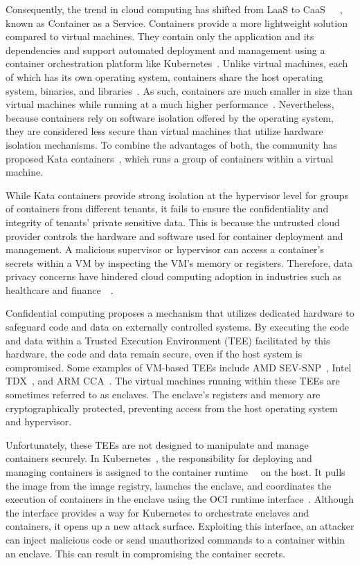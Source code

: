 Consequently, the trend in cloud computing has shifted from LaaS to CaaS~\cite*{Azure_container}~\cite*{Amazon_container}~\cite*{google_container}, known as Container as a Service. Containers provide a more lightweight solution compared to virtual machines. They contain only the application and its dependencies and support automated deployment and management using a 
container orchestration platform like Kubernetes~\cite*{k8s}. Unlike virtual machines, each of which has its own operating system, containers share the host operating system, binaries, and libraries~\cite*{container_vs_vm}. As such, containers are much smaller in size than virtual machines while running at a much higher performance~\cite*{Shirinbab2020PerformanceEO}. 
Nevertheless, because containers rely on software isolation offered by the operating system, they are considered less secure than virtual machines that utilize hardware isolation mechanisms. To combine the advantages of both, the community has proposed Kata containers~\cite*{Kata-Containers}, which 
runs a group of containers within a virtual machine.
 
While Kata containers provide strong isolation at the hypervisor level for groups of containers from different tenants, it fails to ensure the confidentiality and integrity of tenants' private sensitive data. This is because the untrusted cloud provider controls the hardware and software used for 
container deployment and management. A malicious supervisor or hypervisor can access a container's secrets within a VM by inspecting the VM's memory or registers. Therefore, data privacy concerns have hindered cloud computing adoption in industries such as healthcare and finance~\cite*{data_privacy}~\cite*{eu_data_Privacy}.
 
Confidential computing proposes a mechanism that utilizes dedicated hardware to safeguard code and data on externally controlled systems. By executing the code and data within a Trusted Execution Environment (TEE) facilitated by this hardware, the code and data remain secure, even if the host system is compromised. Some examples of VM-based TEEs include 
AMD SEV-SNP~\cite*{SEV_SNP_white_book}, Intel TDX~\cite*{Intel_tdx_whitepaper}, and ARM CCA~\cite*{280904}. The virtual machines running within these TEEs are sometimes referred to as enclaves. The enclave's registers and memory are 
cryptographically protected, preventing access from the host operating system and hypervisor.
 
 
 
Unfortunately, these TEEs are not designed to manipulate and manage containers securely. In Kubernetes~\cite*{k8s}, the responsibility for deploying and managing containers is assigned to the container runtime~\cite*{containerd}~\cite*{cri-o} on the host. It pulls the image from the image registry, launches the enclave, and coordinates the 
execution of containers in the enclave using the OCI runtime interface~\cite*{oci-runtime-spec}. Although the interface provides a way for Kubernetes to orchestrate enclaves and containers, it opens up a new attack surface. Exploiting this interface, an attacker can inject malicious code or send unauthorized commands to 
a container within an enclave. This can result in compromising the container secrets.
 
